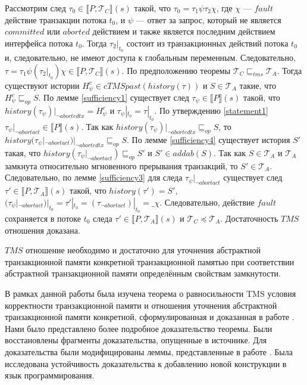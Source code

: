 \begin{mproof}
Рассмотрим след $\tau_0 \in \llbracket P, \mathcal{T}_C \rrbracket(s)$ такой, что $\tau_0 = \tau_1\psi\tau_2\chi$, где $\chi$ --- $fault$ действие транзакции потока $t_0$, и $\psi$ --- ответ за запрос, который не является $committed$ или $aborted$ действием и также является последним действием интерфейса потока $t_0$. Тогда $\tau_2|_{t_0}$ состоит из транзакционных действий потока $t_0$ и, следовательно, не имеют доступа к глобальным переменным. Следовательно, $\tau = \tau_1\psi(\tau_2|_{t_0})\chi \in \llbracket P, \mathcal{T}_C \rrbracket(s)$. По предположению теоремы $\mathcal{T}_C \sqsubseteq_{tms} \mathcal{T}_A$. Тогда существуют истории $H^c_{\psi} \in cTMSpast(history(\tau))$ и $S \in \mathcal{T}_A$ такие, что $H^c_{\psi} \sqsubseteq_{op} S$. По лемме \ref{sufficiency1} существует след $\tau_{\psi} \in \llbracket P \rrbracket(s)$ такой, что $history(\tau_{\psi})|_{\neg abortedtx} = H^c_{\psi}$ и $\tau_{\psi}|_{t_0} = \tau|_{t_0}$. По утверждению \ref{statement1} $\tau_{\psi}|_{\neg abortact} \in \llbracket P \rrbracket(s)$. Так как $history(\tau_{\psi})|_{\neg abortedtx} \sqsubseteq_{op} S$, то $history(\tau_{\psi}|_{\neg abortact})|_{\neg abortedtx} \sqsubseteq_{op} S$. По лемме \ref{sufficiency4} существует история $S'$ такая, что $history(\tau_{\psi}|_{\neg abortact}) \sqsubseteq_{op} S'$ и $S' \in addab(S)$. Так как $S \in \mathcal{T}_A$ и $\mathcal{T}_A$ замкнута относительно мгновенного прерывания транзакций, то $S' \in \mathcal{T}_A$. Следовательно, по лемме \ref{sufficiency3} для следа $\tau_{\psi}|_{\neg abortact}$ существует след $\tau' \in \llbracket P, \mathcal{T}_A \rrbracket(s)$ такой, что $history(\tau') = S'$, $(\tau_{\psi}|_{\neg abortact})|_{t_0} = \tau'|_{t_0} =  (\tau_{\neg abortact})|_{t_0} = \_\chi$. Следовательно, действие $fault$ сохраняется в потоке $t_0$ следа $\tau' \in \llbracket P, \mathcal{T}_A \rrbracket(s)$ и $\mathcal{T}_C \preceq \mathcal{T}_A$. Достаточность $TMS$ отношения доказана.

$TMS$ отношение необходимо и достаточно для уточнения абстрактной транзакционной памяти конкретной транзакционной памятью при соответствии абстрактной транзакционной памяти определённым свойствам замкнутости.                 
\end{mproof}

\Conc
В рамках данной работы была изучена теорема о равносильности TMS условия корректности транзакционной памяти и отношения уточнения абстрактной транзакционной памяти конкретной, сформулированная и доказанная в работе \cite{tms_article}. Нами было представлено более подробное доказательство теоремы. Были восстановлены фрагменты доказательства, опущенные в источнике. Для доказательства были модифицированы леммы, представленные в работе \cite{opacity_article}. Была исследована устойчивость доказательства к добавлению новой конструкции в язык программирования.

